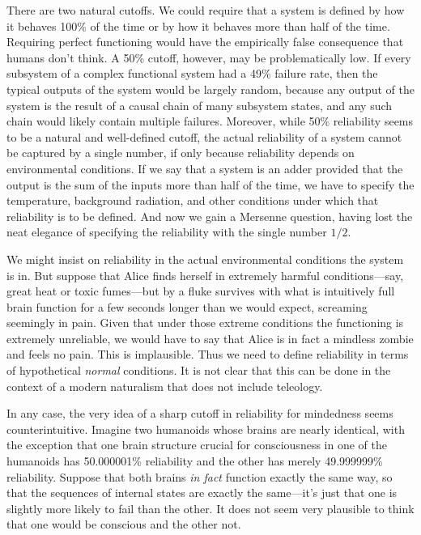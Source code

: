 There are two natural cutoffs. We could require that a system is defined by how it behaves 100\% of the time or by how it behaves
more than half of the time. Requiring perfect functioning would have the empirically false consequence that humans don't think. 
A 50\% cutoff, however, may be problematically low. If every subsystem of a complex functional system had a 49\% failure rate, then 
the typical outputs of the system would be largely random, because any output of the system is the result of a causal chain of many 
subsystem states, and any such chain would likely contain multiple failures. Moreover, while 50\% reliability seems to be a natural
and well-defined cutoff, the actual reliability of a system cannot be captured by a single number, if only because reliability
depends on environmental conditions. If we say that a system is an adder provided that the output is the sum of the inputs more
than half of the time, we have to specify the temperature, background radiation, and other conditions under which that reliability
is to be defined. And now we gain a Mersenne question, having lost the neat elegance of specifying the reliability with the single number $1/2$.

We might insist on reliability in the actual environmental conditions the system is in. But suppose that
Alice finds herself in extremely harmful conditions---say, great heat or toxic fumes---but by a fluke survives with what is intuitively
full brain function for a few seconds longer than we would expect, screaming seemingly in pain. Given that under those extreme conditions
the functioning is extremely unreliable, we would have to say that Alice is in fact a mindless zombie and feels no pain. This is
implausible. Thus we need to define reliability in terms of hypothetical \textit{normal} conditions. It is not clear
that this can be done in the context of a modern naturalism that does not include teleology.

In any case, the very idea of a sharp cutoff in reliability for mindedness seems counterintuitive. Imagine two humanoids whose 
brains are nearly identical, with the exception that one brain structure crucial for consciousness in one of the humanoids has 
50.000001\% reliability and the other has merely 49.999999\% reliability. Suppose that both brains \textit{in fact}
function exactly the same way, so that the sequences of internal states are exactly the same---it's just that one is slightly
more likely to fail than the other. It does not seem very plausible to think that one would be conscious and the other not.

